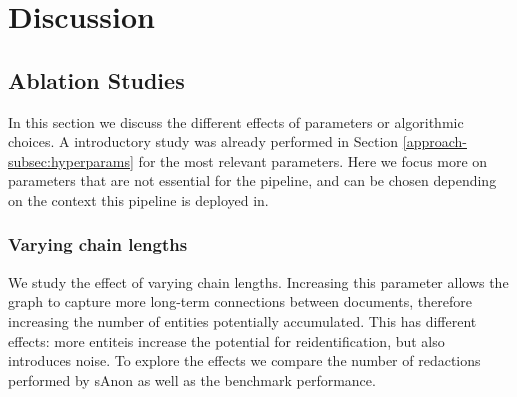 \chapter{Discussion}\label{chapter:discussion}
\section{Ablation Studies}
In this section we discuss the different effects of parameters or algorithmic choices. A introductory study was already performed in Section \ref{approach-subsec:hyperparams} for the most relevant parameters. Here we focus more on parameters that are not essential for the pipeline, and can be chosen depending on the context this pipeline is deployed in.

\subsection{Varying chain lengths}
We study the effect of varying chain lengths. Increasing this parameter allows the graph to capture more long-term connections between documents, therefore increasing the number of entities potentially accumulated. This has different effects: more entiteis increase the potential for reidentification, but also introduces noise. To explore the effects we compare the number of redactions performed by sAnon as well as the benchmark performance.

